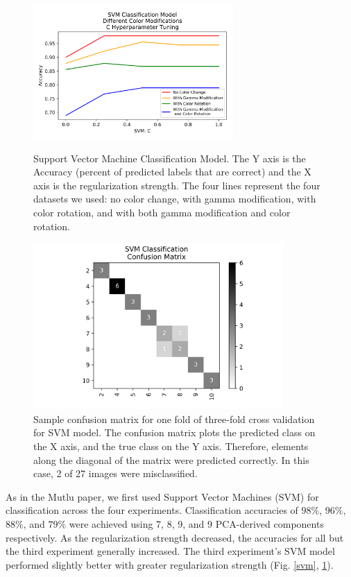 \documentclass[journal]{IEEEtran}
\begin{document}
\begin{figure}
\centering
\includegraphics[height=2in]{SVM/svm_classification.png}
\caption{Support Vector Machine Classification Model. The Y axis is the Accuracy (percent of predicted labels that are correct) and the X axis is the regularization strength. The four lines represent the four datasets we used: no color change, with gamma modification, with color rotation, and with both gamma modification and color rotation.}
\label{svm}

\centering
\includegraphics[height=2.5in]{SVM/SVM_classification_cfm.png}
\caption{Sample confusion matrix for one fold of three-fold cross validation for SVM model. The confusion matrix plots the predicted class on the X axis, and the true class on the Y axis. Therefore, elements along the diagonal of the matrix were predicted correctly. In this case, 2 of 27 images were misclassified.}
\label{svm_confusion}
\end{figure}

As in the Mutlu paper, we first used Support Vector Machines (SVM) for classification across the four experiments. Classification accuracies of $98\%$, $96\%$, $88\%$, and $79\%$ were achieved using 7, 8, 9, and 9 PCA-derived components respectively. As the regularization strength decreased, the accuracies for all but the third experiment generally increased. The third experiment’s SVM model performed slightly better with greater regularization strength (Fig. \ref{svm}, \ref{svm_confusion}).
\end{document}
